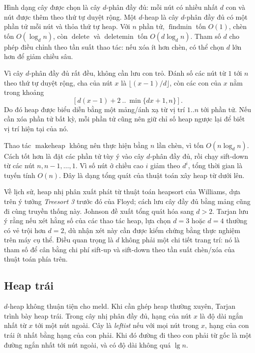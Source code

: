 \documentclass[11pt]{article}
\begin{document}
Hình dạng cây được chọn là cây \(d\)-phân đầy đủ: mỗi nút có nhiều nhất \(d\)
con và nút được thêm theo thứ tự duyệt rộng. Một \(d\)-heap là cây \(d\)-phân
đầy đủ có một phần tử mỗi nút và thỏa thứ tự heap. Với \(n\) phần tử,
\(\operatorname{findmin}\) tốn \(O(1)\), chèn tốn \(O(\log_d n)\), còn
\(\operatorname{delete}\) và \(\operatorname{deletemin}\) tốn
\(O(d\log_d n)\). Tham số \(d\) cho phép điều chỉnh theo tần suất thao tác: nếu
xóa ít hơn chèn, có thể chọn \(d\) lớn hơn để giảm chiều sâu.

Vì cây \(d\)-phân đầy đủ rất đều, không cần lưu con trỏ. Đánh số các nút từ
\(1\) tới \(n\) theo thứ tự duyệt rộng, cha của nút \(x\) là
\(\lfloor(x-1)/d\rfloor\), còn các con của \(x\) nằm trong khoảng
\[
  [d(x-1)+2 \ ..\ \min\{dx+1,n\}].
\]
Do đó heap được biểu diễn bằng một mảng/ánh xạ từ vị trí \(1..n\) tới phần tử.
Nếu cần xóa phần tử bất kỳ, mỗi phần tử cũng nên giữ chỉ số heap ngược lại để
biết vị trí hiện tại của nó.

Thao tác \(\operatorname{makeheap}\) không nên thực hiện bằng \(n\) lần chèn, vì
tốn \(O(n\log_d n)\). Cách tốt hơn là đặt các phần tử tùy ý vào cây \(d\)-phân
đầy đủ, rồi chạy sift-down từ các nút \(n,n-1,\ldots,1\). Vì số nút ở chiều cao
\(i\) giảm theo \(d^i\), tổng thời gian là tuyến tính \(O(n)\). Đây là dạng tổng
quát của thuật toán xây heap từ dưới lên.

Về lịch sử, heap nhị phân xuất phát từ thuật toán heapsort của Williams, dựa
trên ý tưởng \emph{Treesort 3} trước đó của Floyd; cách lưu cây đầy đủ bằng
mảng cũng đi cùng truyền thống này. Johnson đề xuất tổng quát hóa sang
\(d>2\). Tarjan lưu ý rằng nếu xét hằng số của các thao tác heap, lựa chọn
\(d=3\) hoặc \(d=4\) thường có vẻ trội hơn \(d=2\), dù nhận xét này cần được
kiểm chứng bằng thực nghiệm trên máy cụ thể. Điều quan trọng là \(d\) không
phải một chi tiết trang trí: nó là tham số để cân bằng chi phí sift-up và
sift-down theo tần suất chèn/xóa của thuật toán phía trên.

\subsection*{Heap trái}

\(d\)-heap không thuận tiện cho meld. Khi cần ghép heap thường xuyên, Tarjan
trình bày heap trái. Trong cây nhị phân đầy đủ, hạng của nút \(x\) là độ dài
ngắn nhất từ \(x\) tới một nút ngoài. Cây là \emph{leftist} nếu với mọi nút
trong \(x\), hạng của con trái ít nhất bằng hạng của con phải. Khi đó đường đi
theo con phải từ gốc là một đường ngắn nhất tới nút ngoài, và có độ dài
không quá \(\lg n\).
\end{document}
